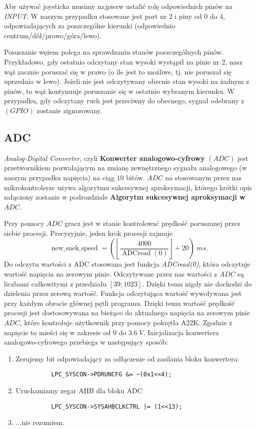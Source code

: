 \documentclass[a4paper,12pt,twoside]{article}
\theoremstyle{plain}
\theoremstyle{definition}
\theoremstyle{remark}
\begin{document}
Aby używać joysticka musimy najpierw ustalić rolę odpowiednich pinów na \textit{INPUT}. W naszym przypadku stosowane jest port nr 2 i piny od $0$ do $4$, odpowiadających za poszczególne kierunki (odpowiednio centrum/dół/prawo/góra/lewo). 

Posuszanie wężem polega na sprawdzaniu stanów poszczególnych pinów. Przykładowo, gdy ostatnio odczytany stan wysoki wystąpił na pinie nr 2, nasz wąż zacznie poruszać się w prawo (o ile jest to możliwe, tj. nie poruszał się uprzednio w lewo). Jeżeli nie jest odczytywany obecnie stan wysoki na żadnym z pinów, to wąż kontynuuje poruszanie się w ostatnio wybranym kierunku. W przypadku, gdy odczytany ruch jest przeciwny do obecnego, sygnał odebrany z $(GPIO)$ zostanie zignorowany.




\subsection{ADC}
\textit{Analog-Digital Converter}, czyli
\textbf{Konwerter analogowo-cyfrowy} $(ADC)$ jest przetwornikiem pozwalającym na zmianę zewnętrznego sygnału analogowego (w naszym przypadku napięcia) na ciąg $10$ bitów. $ADC$ na stosowanym przez nas mikrokontrolerze używa algorytmu sukcesywnej aproksymacji, którego krótki opis załączony zostanie w podrozdziale \textbf{Algorytm sukcesywnej aproksymacji w $ADC$}.

Przy pomocy $ADC$ gracz jest w stanie kontrolować prędkość poruszanej przez siebie procesji. Precyzyjnie, jeden krok procesji zajmuje
\[
\operatorname{new\_snek\_speed} =\left( \left\lfloor \frac{4000}{ \operatorname{ADCread}(0)} \right\rfloor + 20 \right) \; ms.
\]
Do odczytu wartości z ADC stosowana jest funkcja \textit{ADCread(0)}, która odczytuje wartość napięcia na zerowym pinie.
Odczytywane przez nas wartości z $ADC$ są liczbami całkowitymi z przedziału $[39;1023]$. Dzięki temu nigdy nie dochodzi do dzielenia przez zerową wartość. Funkcja odczytująca wartość wywoływana jest przy każdym obrocie głównej pętli programu. Dzięki temu wartość prędkość procesji jest dostosowywana na bieżąco do aktualnego napięcia na zerowym pinie $ADC$, które kontroluje użytkownik przy pomocy pokrętła A22K. Zgodnie z \cite{INST} napięcie to mieści się w zakresie od $0$ do $3.6 \;V$. 
Inicjalizacja konwertera analogowo-cyfrowego przebiega w następujący sposób:
\begin{enumerate}
	\item Zerujemy bit odpowiadający za odłączenie od zasilania bloku konwertera:
		\begin{verbatim}
		  LPC_SYSCON->PDRUNCFG &= ~(0x1<<4);
		\end{verbatim}
	\item Uruchamiamy zegar AHB dla bloku ADC
		\begin{verbatim}
		  LPC_SYSCON->SYSAHBCLKCTRL |= (1<<13);
		\end{verbatim}
	\item ...nie rozumiem.
\end{enumerate}
\end{document}
